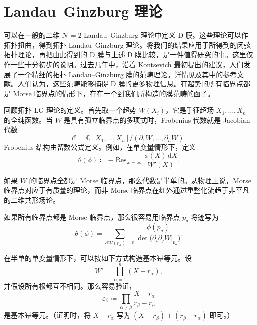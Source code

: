 \section{Landau--Ginzburg 理论}\label{sec:2.4}

可以在一般的二维 $\mathcal{N}=2$ Landau--Ginzburg 理论中定义 D 膜。这些理论可以作拓扑扭曲，得到拓扑 Landau--Ginzburg 理论。将我们的结果应用于所得到的闭弦拓扑理论，再把由此得到的 D 膜与上述 D 膜比较，是一件值得研究的事。这里仅作一些十分初步的说明。过去几年中，沿着 Kontsevich 最初提出的建议，人们发展了一个精细的拓扑 Landau--Ginzburg 膜的范畴理论。详情见及其中的参考文献。人们认为，这些范畴能够捕捉 D 膜的更多物理信息。在超势的所有临界点都是 Morse 临界点的情形下，存在一个到我们所构造的膜范畴的函子。

回顾拓扑 LG 理论的定义。首先取一个超势 $W(X_i)$，它是手征超场 $X_1,\ldots,X_n$ 的全纯函数。当 $W$ 是具有孤立临界点的多项式时，Frobenius 代数就是 Jacobian 代数
\begin{equation}\label{eq:2.57}
\mathcal{C}=\mathbb{C}[X_1,\ldots,X_n]/(\partial_1W,\ldots,\partial_nW).
\end{equation}
Frobenius 结构由留数公式定义。例如，在单变量情形下，定义
\begin{equation}\label{eq:2.58}
\theta(\phi)\coloneqq-\operatorname{Res}_{X=\infty}\frac{\phi(X)\,\mathrm{d}X}{W'(X)}.
\end{equation}

如果 $W$ 的临界点全都是 Morse 临界点，那么代数是半单的。从物理上说，Morse 临界点对应于有质量的理论，而非 Morse 临界点在红外通过重整化流趋于非平凡的二维共形场论。

如果所有临界点都是 Morse 临界点，那么很容易用临界点 $p_a$ 将迹写为
\begin{equation}\label{eq:2.59}
\theta(\phi)=\sum_{\mathrm{d}W(p_a)=0}\frac{\phi(p_a)}{\det\bigl(\partial_i\partial_jW|_{p_a}\bigr)}.
\end{equation}

在半单的单变量情形下，可以按如下方式构造基本幂等元。设
\begin{equation}\label{eq:2.60}
W'=\prod_{\alpha=1}^n(X-r_\alpha),
\end{equation}
并假设所有根都互不相同。那么容易验证，
\begin{equation}\label{eq:2.61}
\varepsilon_\beta\coloneqq\prod_{\alpha\ne\beta}\frac{X-r_\alpha}{r_\beta-r_\alpha}
\end{equation}
是基本幂等元。（证明时，将 $X-r_\alpha$ 写为 $(X-r_\beta)+(r_\beta-r_\alpha)$ 即可。）

